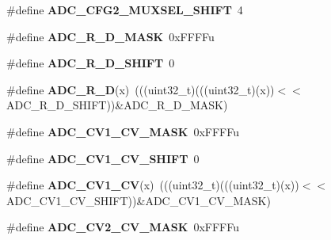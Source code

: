 \begin{DoxyCompactItemize}
\item 
\#define {\bfseries A\+D\+C\+\_\+\+C\+F\+G2\+\_\+\+M\+U\+X\+S\+E\+L\+\_\+\+S\+H\+I\+FT}~4\hypertarget{group__ADC__Register__Masks_ga3d74b5bda99558af8b4f0e986ef7ea9b}{}\label{group__ADC__Register__Masks_ga3d74b5bda99558af8b4f0e986ef7ea9b}

\item 
\#define {\bfseries A\+D\+C\+\_\+\+R\+\_\+\+D\+\_\+\+M\+A\+SK}~0x\+F\+F\+F\+Fu\hypertarget{group__ADC__Register__Masks_ga7dadc81f58826b303fb83918820cd177}{}\label{group__ADC__Register__Masks_ga7dadc81f58826b303fb83918820cd177}

\item 
\#define {\bfseries A\+D\+C\+\_\+\+R\+\_\+\+D\+\_\+\+S\+H\+I\+FT}~0\hypertarget{group__ADC__Register__Masks_ga8e2365e522772584a5ee2dd6a8b0987a}{}\label{group__ADC__Register__Masks_ga8e2365e522772584a5ee2dd6a8b0987a}

\item 
\#define {\bfseries A\+D\+C\+\_\+\+R\+\_\+D}(x)~(((uint32\+\_\+t)(((uint32\+\_\+t)(x))$<$$<$A\+D\+C\+\_\+\+R\+\_\+\+D\+\_\+\+S\+H\+I\+FT))\&A\+D\+C\+\_\+\+R\+\_\+\+D\+\_\+\+M\+A\+SK)\hypertarget{group__ADC__Register__Masks_ga170d774b5b873c5b8355cd8a57810f32}{}\label{group__ADC__Register__Masks_ga170d774b5b873c5b8355cd8a57810f32}

\item 
\#define {\bfseries A\+D\+C\+\_\+\+C\+V1\+\_\+\+C\+V\+\_\+\+M\+A\+SK}~0x\+F\+F\+F\+Fu\hypertarget{group__ADC__Register__Masks_gad67c3b5f385cd9b26be8257134e1e3cf}{}\label{group__ADC__Register__Masks_gad67c3b5f385cd9b26be8257134e1e3cf}

\item 
\#define {\bfseries A\+D\+C\+\_\+\+C\+V1\+\_\+\+C\+V\+\_\+\+S\+H\+I\+FT}~0\hypertarget{group__ADC__Register__Masks_ga1925520ab1dd2eb81e0e4505af905c13}{}\label{group__ADC__Register__Masks_ga1925520ab1dd2eb81e0e4505af905c13}

\item 
\#define {\bfseries A\+D\+C\+\_\+\+C\+V1\+\_\+\+CV}(x)~(((uint32\+\_\+t)(((uint32\+\_\+t)(x))$<$$<$A\+D\+C\+\_\+\+C\+V1\+\_\+\+C\+V\+\_\+\+S\+H\+I\+FT))\&A\+D\+C\+\_\+\+C\+V1\+\_\+\+C\+V\+\_\+\+M\+A\+SK)\hypertarget{group__ADC__Register__Masks_ga941b887791f6ce780cb100ff3ef98407}{}\label{group__ADC__Register__Masks_ga941b887791f6ce780cb100ff3ef98407}

\item 
\#define {\bfseries A\+D\+C\+\_\+\+C\+V2\+\_\+\+C\+V\+\_\+\+M\+A\+SK}~0x\+F\+F\+F\+Fu\hypertarget{group__ADC__Register__Masks_gab61d022e3c8d84d77f2895a91c049023}{}\label{group__ADC__Register__Masks_gab61d022e3c8d84d77f2895a91c049023}


\end{DoxyCompactItemize}
